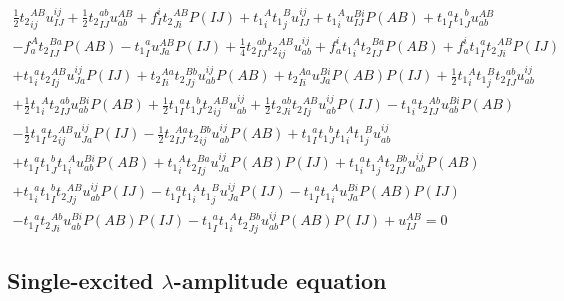 \begin{gather*}
\frac{1}{2}{t_2}^{AB}_{ij} u^{ij}_{IJ}
+ \frac{1}{2}{t_2}^{ab}_{IJ} u^{AB}_{ab}
+ f^{i}_{I} {t_2}^{AB}_{Ji} P(IJ)
+ {t_1}^{A}_{i} {t_1}^{B}_{j} u^{ij}_{IJ}
+ {t_1}^{A}_{i} u^{Bi}_{IJ} P(AB)
+ {t_1}^{a}_{I} {t_1}^{b}_{J} u^{AB}_{ab} \\
- f^{A}_{a} {t_2}^{Ba}_{IJ} P(AB)
- {t_1}^{a}_{I} u^{AB}_{Ja} P(IJ)   
+ \frac{1}{4}{t_2}^{ab}_{IJ} {t_2}^{AB}_{ij} u^{ij}_{ab}
+ f^{i}_{a} {t_1}^{A}_{i} {t_2}^{Ba}_{IJ} P(AB)
+ f^{i}_{a} {t_1}^{a}_{I} {t_2}^{AB}_{Ji} P(IJ) \\
+ {t_1}^{a}_{i} {t_2}^{AB}_{Ij} u^{ij}_{Ja} P(IJ) 
+ {t_2}^{Aa}_{Ii} {t_2}^{Bb}_{Jj} u^{ij}_{ab} P(AB)
+ {t_2}^{Aa}_{Ii} u^{Bi}_{Ja} P(AB) P(IJ)
+  \frac{1}{2}{t_1}^{A}_{i} {t_1}^{B}_{j} {t_2}^{ab}_{IJ} u^{ij}_{ab} \\
+  \frac{1}{2}{t_1}^{A}_{i} {t_2}^{ab}_{IJ} u^{Bi}_{ab} P(AB)
+  \frac{1}{2}{t_1}^{a}_{I} {t_1}^{b}_{J} {t_2}^{AB}_{ij} u^{ij}_{ab}
+  \frac{1}{2}{t_2}^{ab}_{Ji} {t_2}^{AB}_{Ij} u^{ij}_{ab} P(IJ) 
- {t_1}^{a}_{i} {t_2}^{Ab}_{IJ} u^{Bi}_{ab} P(AB) \\
-  \frac{1}{2}{t_1}^{a}_{I} {t_2}^{AB}_{ij} u^{ij}_{Ja} P(IJ)
-  \frac{1}{2}{t_2}^{Aa}_{IJ} {t_2}^{Bb}_{ij} u^{ij}_{ab} P(AB)
+ {t_1}^{a}_{I} {t_1}^{b}_{J} {t_1}^{A}_{i} {t_1}^{B}_{j} u^{ij}_{ab} \\
+ {t_1}^{a}_{I} {t_1}^{b}_{J} {t_1}^{A}_{i} u^{Bi}_{ab} P(AB)
+ {t_1}^{A}_{i} {t_2}^{Ba}_{Ij} u^{ij}_{Ja} P(AB) P(IJ)
+ {t_1}^{a}_{i} {t_1}^{A}_{j} {t_2}^{Bb}_{IJ} u^{ij}_{ab} P(AB) \\
+ {t_1}^{a}_{i} {t_1}^{b}_{I} {t_2}^{AB}_{Jj} u^{ij}_{ab} P(IJ)
- {t_1}^{a}_{I} {t_1}^{A}_{i} {t_1}^{B}_{j} u^{ij}_{Ja} P(IJ)
- {t_1}^{a}_{I} {t_1}^{A}_{i} u^{Bi}_{Ja} P(AB) P(IJ)  \\
- {t_1}^{a}_{I} {t_2}^{Ab}_{Ji} u^{Bi}_{ab} P(AB) P(IJ)
- {t_1}^{a}_{I} {t_1}^{A}_{i} {t_2}^{Bb}_{Jj} u^{ij}_{ab} P(AB) P(IJ)
+ u^{AB}_{IJ} = 0
\end{gather*}

\subsection{Single-excited $\lambda$-amplitude equation}

